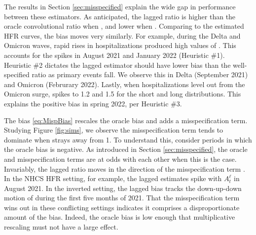 \documentclass{article}
\renewcommand{\hat}{\widehat} %
\newcommand{\given}{\, \vert \,}
\begin{document}
The results in Section \ref{sec:misspecified} explain the wide
gap in performance between these estimators. 
As anticipated, the lagged ratio is higher than the oracle convolutional
ratio when , and lower when . Comparing  to the estimated HFR curves, the bias moves
very similarly. 
For example, during the Delta and Omicron waves, rapid rises in
hospitalizations produced high values of . This accounts for
the spikes in August 2021 and January 2022 (Heuristic \#1). 
Heuristic \#2 dictates the lagged estimator should have lower bias than the well-specified ratio as primary events
fall. We observe this in Delta (September 2021) and Omicron (Februrary 2022).  
Lastly, when hospitalizations level out from
the Omicron surge,  spikes to 1.2 and 1.5 for the short
and long distributions. This explains the positive bias in spring 2022, per Heuristic \#3.

The bias \eqref{eq:MispBias} rescales the oracle bias and adds a
misspecification term. Studying Figure \ref{fig:sims}, we observe the
misspecification term tends to dominate when  strays away from 
1. To understand this, consider periods in which the oracle bias is negative. As
introduced in Section \ref{sec:misspecified}, the oracle and misspecification
terms are at odds with each other when this is the case. Invariably, the lagged
ratio moves in the direction of the misspecification term
. In the NHCS HFR setting, for example, the lagged 
estimates spike with $A_t^\ell$ in August 2021. In the inverted setting, the 
lagged bias tracks the down-up-down motion of  during the
first five months of 2021. That the misspecification term wins out in these
conflicting settings indicates it comprises a disproportionate amount of the
bias. Indeed, the oracle bias is low enough that multiplicative rescaling must 
not have a large effect.  
\end{document}

